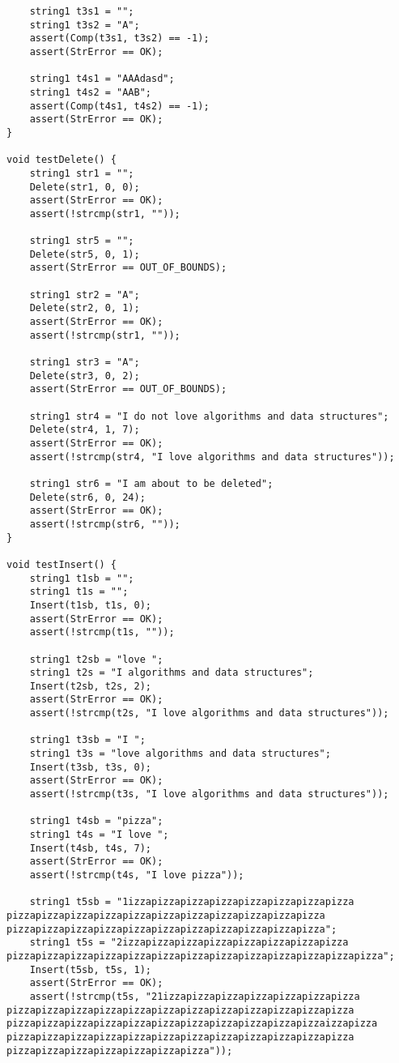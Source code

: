\documentclass[a4paper,14pt]{extarticle}
\begin{document}
\begin{enumerate}
\begin{verbatim}
    string1 t3s1 = "";
    string1 t3s2 = "A";
    assert(Comp(t3s1, t3s2) == -1);
    assert(StrError == OK);

    string1 t4s1 = "AAAdasd";
    string1 t4s2 = "AAB";
    assert(Comp(t4s1, t4s2) == -1);
    assert(StrError == OK);
}

void testDelete() {
    string1 str1 = "";
    Delete(str1, 0, 0);
    assert(StrError == OK);
    assert(!strcmp(str1, ""));

    string1 str5 = "";
    Delete(str5, 0, 1);
    assert(StrError == OUT_OF_BOUNDS);

    string1 str2 = "A";
    Delete(str2, 0, 1);
    assert(StrError == OK);
    assert(!strcmp(str1, ""));

    string1 str3 = "A";
    Delete(str3, 0, 2);
    assert(StrError == OUT_OF_BOUNDS);

    string1 str4 = "I do not love algorithms and data structures";
    Delete(str4, 1, 7);
    assert(StrError == OK);
    assert(!strcmp(str4, "I love algorithms and data structures"));

    string1 str6 = "I am about to be deleted";
    Delete(str6, 0, 24);
    assert(StrError == OK);
    assert(!strcmp(str6, ""));
}

void testInsert() {
    string1 t1sb = "";
    string1 t1s = "";
    Insert(t1sb, t1s, 0);
    assert(StrError == OK);
    assert(!strcmp(t1s, ""));

    string1 t2sb = "love ";
    string1 t2s = "I algorithms and data structures";
    Insert(t2sb, t2s, 2);
    assert(StrError == OK);
    assert(!strcmp(t2s, "I love algorithms and data structures"));

    string1 t3sb = "I ";
    string1 t3s = "love algorithms and data structures";
    Insert(t3sb, t3s, 0);
    assert(StrError == OK);
    assert(!strcmp(t3s, "I love algorithms and data structures"));

    string1 t4sb = "pizza";
    string1 t4s = "I love ";
    Insert(t4sb, t4s, 7);
    assert(StrError == OK);
    assert(!strcmp(t4s, "I love pizza"));

    string1 t5sb = "1izzapizzapizzapizzapizzapizzapizzapizza
pizzapizzapizzapizzapizzapizzapizzapizzapizzapizzapizza
pizzapizzapizzapizzapizzapizzapizzapizzapizzapizzapizza";
    string1 t5s = "2izzapizzapizzapizzapizzapizzapizzapizza
pizzapizzapizzapizzapizzapizzapizzapizzapizzapizzapizzapizzapizza";
    Insert(t5sb, t5s, 1);
    assert(StrError == OK);
    assert(!strcmp(t5s, "21izzapizzapizzapizzapizzapizzapizza
pizzapizzapizzapizzapizzapizzapizzapizzapizzapizzapizzapizza
pizzapizzapizzapizzapizzapizzapizzapizzapizzapizzapizzaizzapizza
pizzapizzapizzapizzapizzapizzapizzapizzapizzapizzapizzapizza
pizzapizzapizzapizzapizzapizzapizza"));


\end{verbatim}
\end{enumerate}
\end{document}
